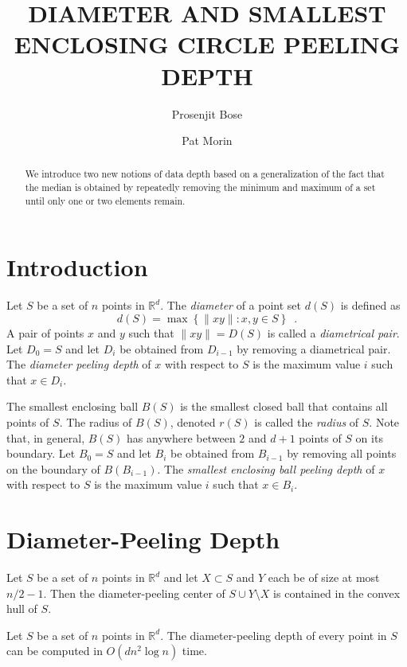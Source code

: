 \documentclass[lotsofwhite]{patmorin}
\title{\MakeUppercase{Diameter and Smallest Enclosing Circle Peeling Depth}}
\author{Prosenjit Bose \and Pat Morin}
\date{}
\begin{document}
\maketitle
\begin{abstract}
We introduce two new notions of data depth based on a generalization
of the fact that the median is obtained by repeatedly removing the
minimum and maximum of a set until only one or two elements remain.
\end{abstract}

\section{Introduction}

Let $S$ be a set of $n$ points in $\mathbb{R}^d$.  The \emph{diameter} 
of a point set $d(S)$ is defined as
\[
    d(S)=\max\left\{\|xy\|:x,y\in S\right\} \enspace .
\]  
A pair of points $x$ and $y$ such that
$\|xy\|=D(S)$ is called a \emph{diametrical pair}. Let $D_0=S$ and
let $D_i$ be obtained from $D_{i-1}$ by removing a diametrical pair.
The \emph{diameter peeling depth} of $x$ with respect to $S$ is the
maximum value $i$ such that $x\in D_i$.

The smallest enclosing ball $B(S)$ is the smallest closed ball that
contains all points of $S$.  The radius of $B(S)$, denoted $r(S)$ is
called the \emph{radius} of $S$.  Note that, in general, $B(S)$ has
anywhere between $2$ and $d+1$ points of $S$ on its boundary.  Let
$B_0=S$ and let $B_i$ be obtained from $B_{i-1}$ by removing all
points on the boundary of $B(B_{i-1})$.  The \emph{smallest enclosing
ball peeling depth} of $x$ with respect to $S$ is the maximum value
$i$ such that $x\in B_{i}$.


\section{Diameter-Peeling Depth}

\begin{thm}
Let $S$ be a set of $n$ points in $\mathbb{R}^d$ and let $X\subset S$ and
$Y$ each be of size at most $n/2-1$.  Then the diameter-peeling center
of $S\cup Y\setminus X$ is contained in the convex hull of $S$.
\end{thm}


\begin{thm}
Let $S$ be a set of $n$ points in $\mathbb{R}^d$.  The
diameter-peeling depth of every point in $S$ can be computed in
$O(dn^2\log n)$ time.
\end{thm}
\end{document}
